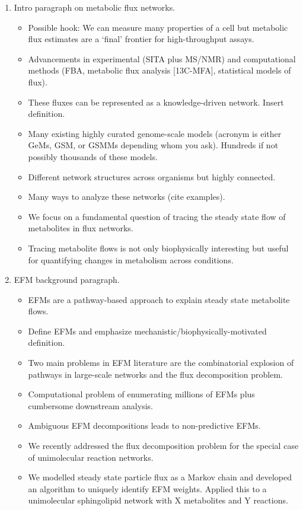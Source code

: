 \documentclass[11pt]{article}
\begin{document}
\begin{enumerate}
    \item Intro paragraph on metabolic flux networks.
    \begin{itemize}
        \item Possible hook: We can measure many properties of a cell but metabolic flux estimates are a `final' frontier for high-throughput assays.
        \item Advancements in experimental (SITA plus MS/NMR) and computational methods (FBA, metabolic flux analysis [13C-MFA], statistical models of flux).
        \item These fluxes can be represented as a knowledge-driven network. Insert definition.
        \item Many existing highly curated genome-scale models (acronym is either GeMs, GSM, or GSMMs depending whom you ask). Hundreds if not possibly thousands of these models.
        \item Different network structures across organisms but highly connected.
        \item Many ways to analyze these networks (cite examples).
        \item We focus on a fundamental question of tracing the steady state flow of metabolites in flux networks.
        \item Tracing metabolite flows is not only biophysically interesting but useful for quantifying changes in metabolism across conditions.
    \end{itemize}
    \item EFM background paragraph.
    \begin{itemize}
        \item EFMs are a pathway-based approach to explain steady state metabolite flows.
        \item Define EFMs and emphasize mechanistic/biophysically-motivated definition.
        \item Two main problems in EFM literature are the combinatorial explosion of pathways in large-scale networks and the flux decomposition problem.
        \item Computational problem of enumerating millions of EFMs plus cumbersome downstream analysis.
        \item Ambiguous EFM decompositions leads to non-predictive EFMs.
        \item We recently addressed the flux decomposition problem for the special case of unimolecular reaction networks.
        \item We modelled steady state particle flux as a Markov chain and developed an algorithm to uniquely identify EFM weights. Applied this to a unimolecular sphingolipid network with X metabolites and Y reactions.

\end{itemize}
\end{enumerate}
\end{document}
